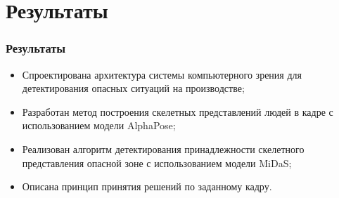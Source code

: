\section{Результаты}
\begin{frame}
    \frametitle{Результаты}
    \begin{itemize}
        \item Спроектирована архитектура системы компьютерного зрения для детектирования опасных ситуаций на производстве;
        \item Разработан метод построения скелетных представлений людей в кадре с использованием модели AlphaPose;
        \item Реализован алгоритм детектирования принадлежности скелетного представления опасной зоне с использованием модели MiDaS;
        \item Описана принцип принятия решений по заданному кадру.
    \end{itemize}
\end{frame}
